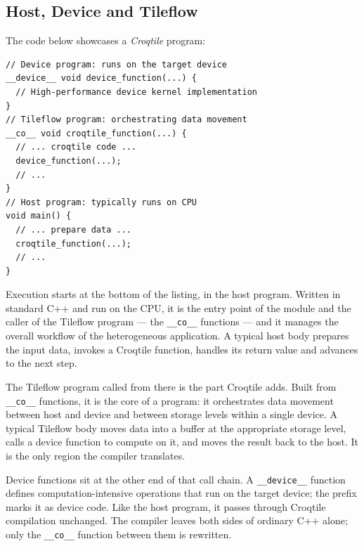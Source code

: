 \subsection*{Host, Device and Tileflow}

The code below showcases a \emph{Croqtile} program:

\begin{lstlisting}[language=croqtile,caption={The three regions of one source file}]
// Device program: runs on the target device
__device__ void device_function(...) {
  // High-performance device kernel implementation
}
// Tileflow program: orchestrating data movement
__co__ void croqtile_function(...) {
  // ... croqtile code ...
  device_function(...);
  // ...
}
// Host program: typically runs on CPU
void main() {
  // ... prepare data ...
  croqtile_function(...);
  // ...
}
\end{lstlisting}

Execution starts at the bottom of the listing, in the host program. Written in standard C++ and run on the CPU, it is the entry point of the module and the caller of the Tileflow program --- the \texttt{\_\_co\_\_} functions --- and it manages the overall workflow of the heterogeneous application. A typical host body prepares the input data, invokes a Croqtile function, handles its return value and advances to the next step.

The Tileflow program called from there is the part Croqtile adds. Built from \texttt{\_\_co\_\_} functions, it is the core of a  program: it orchestrates data movement between host and device and between storage levels within a single device. A typical Tileflow body moves data into a buffer at the appropriate storage level, calls a device function to compute on it, and moves the result back to the host. It is the only region the compiler translates.

Device functions sit at the other end of that call chain. A \texttt{\_\_device\_\_} function defines computation-intensive operations that run on the target device; the prefix marks it as device code. Like the host program, it passes through Croqtile compilation unchanged. The compiler leaves both sides of ordinary C++ alone; only the \texttt{\_\_co\_\_} function between them is rewritten.
